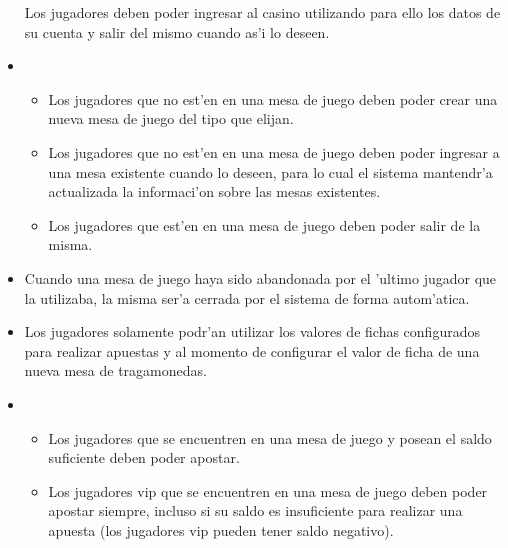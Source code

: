 \begin{itemize}
    Los jugadores deben poder ingresar al casino utilizando para ello los datos de su cuenta y salir del mismo cuando as'i lo deseen.
 
\item {}

    \begin{itemize}
        \item Los jugadores que no est'en en una mesa de juego deben poder crear una nueva mesa de juego del tipo que elijan.
        \item Los jugadores que no est'en en una mesa de juego deben poder ingresar a una mesa existente cuando lo deseen, para lo cual el sistema mantendr'a actualizada la informaci'on sobre las mesas existentes.
        \item Los jugadores que est'en en una mesa de juego deben poder salir de la misma.
    \end{itemize}

\item {} 

    Cuando una mesa de juego haya sido abandonada por el 'ultimo jugador que la utilizaba, la misma ser'a cerrada por el sistema de forma autom'atica.

\item {} 

    Los jugadores solamente podr'an utilizar los valores de fichas configurados para realizar apuestas y al momento de configurar el valor de ficha de una nueva mesa de tragamonedas.

\item {} 

    \begin{itemize}
        \item Los jugadores que se encuentren en una mesa de juego y posean el saldo suficiente deben poder apostar.
        \item Los jugadores vip que se encuentren en una mesa de juego deben poder apostar siempre, incluso si su saldo es insuficiente para realizar una apuesta (los jugadores vip pueden tener saldo negativo).
    \end{itemize}    


\end{itemize}
